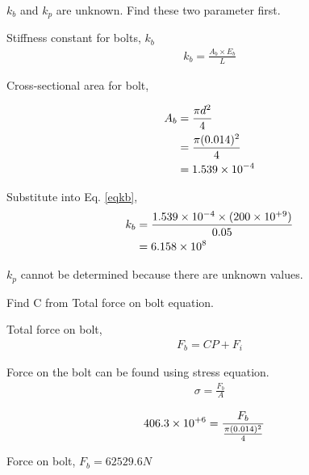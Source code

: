 \documentclass[a4paper, fleqn]{article}
\providecommand{\sci}[1]{\protect\ensuremath{\times 10^{\StrSubstitute[0]{#1}{e}{}}}}
\begin{document}
$k_b$ and $k_p$ are unknown. Find these two parameter first.

Stiffness constant for bolts, $k_b$
\begin{equation} \label{eqkb}
    \begin{aligned}
    k_b=\frac{A_b \times E_b}{L}
    \end{aligned}
\end{equation}

Cross-sectional area for bolt,

\begin{equation*}
    \begin{aligned}
    A_b &=\frac{\pi d^2}{4}\\
    &= \frac{\pi (0.014)^2}{4}\\
    &= 1.539\sci{e-4}
    \end{aligned}
\end{equation*}

Substitute into Eq. \ref{eqkb},
\begin{equation}
    \begin{aligned}
    k_b &= \frac{1.539\sci{e-4} \times (200\sci{e+9})}{0.05}\\
    &= 6.158\sci{e8}
    \end{aligned}
\end{equation}

$k_p$ cannot be determined because there are unknown values.

Find C from Total force on bolt equation.

Total force on bolt,
\begin{equation} \label{totalForce}
    \begin{aligned}
    F_b=CP+F_i
    \end{aligned}
\end{equation}

Force on the bolt can be found using stress equation.
\begin{equation}
    \begin{aligned}
    \sigma = \frac{F_b}{A}
    \end{aligned}
\end{equation}

\begin{equation*}
    \begin{aligned}
    406.3\sci{e+6} &=\frac{F_b}{\frac{\pi (0.014)^2}{4}}
    \end{aligned}
\end{equation*}

Force on bolt, $F_b=62529.6N$
\end{document}
